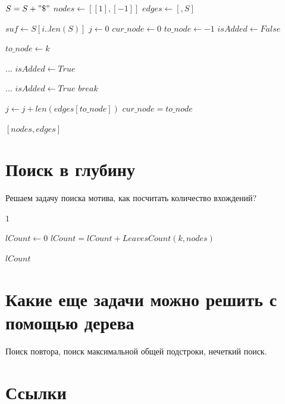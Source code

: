 \documentclass[letterpaper, 11pt]{article}
\begin{document}
\begin{algorithmic}[1]
\State $S = S + " \$ "$
\State $nodes \gets [[1], [-1]]$
\State $edges \gets [, S]$

\item[]
\State $suf \gets S[i..len(S)]$
\State $j \gets 0$
\State $cur\_node \gets 0$
\State $to\_node \gets -1$
\State $isAdded \gets False$

\item[]
\State $to\_node \gets k$
\EndIf
\EndFor

\item[]

\State $...$ 
\State $isAdded \gets True$
\Else
{}

\State $...$ 
\State $isAdded \gets True$
\State $break$
\EndIf

\EndFor

\State $j \gets j + len(edges[to\_node])$
\State $cur\_node = to\_node$

\EndIf

\EndWhile

\EndFor
\item[]
\State \Return $[nodes, edges]$
\EndProcedure
\end{algorithmic}


\clearpage
\section{Поиск в глубину}
\par
Решаем задачу поиска мотива, как посчитать количество вхождений?

\begin{algorithmic}[1]
\State \Return $1$
\EndIf
\item[]
\State $lCount \gets 0$
\State $lCount = lCount + LeavesCount(k, nodes)$
\EndFor
\item[]
\State \Return $lCount$
\EndProcedure
\end{algorithmic}

\section{Какие еще задачи можно решить с помощью дерева}
\par
Поиск повтора, поиск максимальной общей подстроки, нечеткий поиск.

\section{Ссылки}

\begingroup
\renewcommand{\section}[2]{}%
\begin{thebibliography}{7}


\end{thebibliography}
\endgroup
\end{document}
